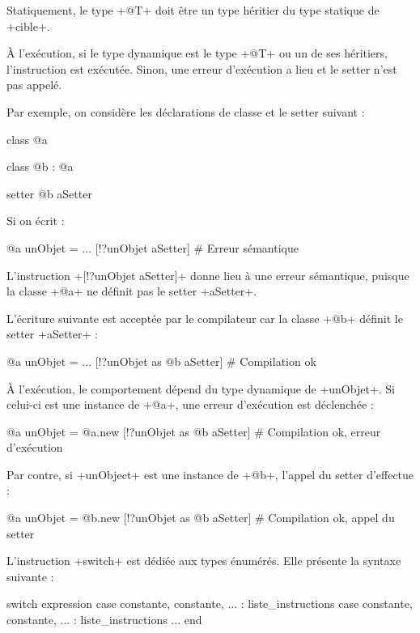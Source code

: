 Statiquement, le type \ggs+@T+ doit être un type héritier du type statique de \ggs+cible+.

À l'exécution, si le type dynamique est le type \ggs+@T+ ou un de ses héritiers, l'instruction est exécutée. Sinon, une erreur d'exécution a lieu et le setter n'est pas appelé.

Par exemple, on considère les déclarations de classe et le setter suivant :

\begin{galgas}
class @a { }

class @b : @a { }

setter @b aSetter { }
\end{galgas}

Si on écrit :
\begin{galgas}
@a unObjet = ...
[!?unObjet aSetter] # Erreur sémantique
\end{galgas}

L'instruction \ggs+[!?unObjet aSetter]+ donne lieu à une erreur sémantique, puisque la classe \ggs+@a+ ne définit pas le setter \ggs+aSetter+.

L'écriture suivante est acceptée par le compilateur car la classe \ggs+@b+ définit le setter \ggs+aSetter+ :
\begin{galgas}
@a unObjet = ...
[!?unObjet as @b aSetter] # Compilation ok
\end{galgas}

À l'exécution, le comportement dépend du type dynamique de \ggs+unObjet+. Si celui-ci est une instance de \ggs+@a+, une erreur d'exécution est déclenchée :
\begin{galgas}
@a unObjet = @a.new
[!?unObjet as @b aSetter] # Compilation ok, erreur d'exécution
\end{galgas}


Par contre, si \ggs+unObject+ est une instance de \ggs+@b+, l'appel du setter d'effectue :
\begin{galgas}
@a unObjet = @b.new
[!?unObjet as @b aSetter] # Compilation ok, appel du setter
\end{galgas}











L'instruction \ggs+switch+ est dédiée aux types énumérés. Elle présente la syntaxe suivante :

\begin{galgas}
switch expression
case constante, constante, ... :
  liste_instructions
case constante, constante, ... :
  liste_instructions
...
end
\end{galgas}


